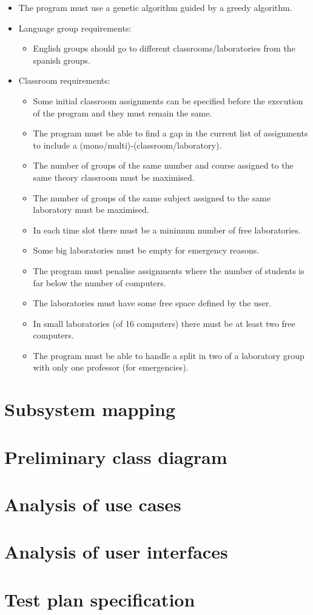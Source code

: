 \begin{itemize}
    \item The program must use a genetic algorithm guided by a greedy algorithm.
    \item Language group requirements:
        \begin{itemize}
            \item English groups should go to different classrooms/laboratories from the spanish groups.
        \end{itemize}
    \item Classroom requirements:
        \begin{itemize}
            \item Some initial classroom assignments can be specified before the execution of the program and they must remain the same.
            \item The program must be able to find a gap in the current list of assignments to include a (mono/multi)-(classroom/laboratory).
            \item The number of groups of the same number and course assigned to the same theory classroom must be maximised.
            \item The number of groups of the same subject assigned to the same laboratory must be maximised.
            \item In each time slot there must be a minimum number of free laboratories.
            \item Some big laboratories must be empty for emergency reasons.
            \item The program must penalise assignments where the number of students is far below the number of computers.
            \item The laboratories must have some free space defined by the user.
            \item In small laboratories (of 16 computers) there must be at least two free computers.
            \item The program must be able to handle a split in two of a laboratory group with only one professor (for emergencies).
        \end{itemize}
\end{itemize}


\section{Subsystem mapping}

\section{Preliminary class diagram}

\section{Analysis of use cases}

\section{Analysis of user interfaces}

\section{Test plan specification}

